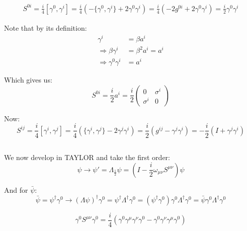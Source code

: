 \documentclass[11pt]{article}
\newcommand{\half}{\frac{1}{2}}
\begin{document}
\subsection{}

\begin{equation}
    \begin{split}
        S^{0i}=\frac{i}{4}[\gamma^0,\gamma^i] = 
        \frac{i}{4}(-\{ \gamma^0,\gamma^i\} +2\gamma^0\gamma^i)=
        \frac{i}{4}(-2g^{0i} + 2\gamma^0\gamma^i)=
        \frac{i}{2}\gamma^0\gamma^i
    \end{split}
\end{equation}

Note that by its definition:
\begin{equation}
\begin{split}
    \gamma^i&=\beta a^i\\
    \Rightarrow \beta \gamma^i &= \beta^2 a^i = a^i\\
    \Rightarrow \gamma^0\gamma^i &= a^i
\end{split}
\end{equation}

Which gives us:
\begin{equation}
    S^{0i} = \frac{i}{2}a^i =
    \frac{i}{2}
    \begin{pmatrix}
        0&\sigma^i\\
        \sigma^i & 0
    \end{pmatrix}
\end{equation}

Now: $$S^{ij} = \frac{i}{4}[\gamma^i,\gamma^j] = \frac{i}{4}(\{\gamma^i,\gamma^j\} - 2\gamma^j\gamma^i) = \frac{i}{2}(g^{ij}-\gamma^j\gamma^i) = -\frac{i}{2}(I+\gamma^j\gamma^i)$$


\subsection{}
We now develop in TAYLOR and take the first order:
\begin{equation}
    \psi\rightarrow\psi ' = \Lambda_{\half} \psi = \left(I - \frac{i}{2}\omega_{\mu\nu}S^{\mu\nu}\right)\psi
\end{equation}

\noindent
And for $\bar\psi$:
$$\bar\psi=\psi^\dagger \gamma^0 \to (\Lambda \psi)^\dagger \gamma^0 = \psi^\dagger \Lambda^\dagger \gamma^0=(\psi^\dagger \gamma^0)\gamma^0\Lambda^\dagger \gamma^0 = \bar\psi\gamma^0\Lambda^\dagger\gamma^0$$

$$\gamma^0S^{\mu \nu}\gamma^0 = \frac{i}{4}(\gamma^0 \gamma^\mu \gamma^\nu \gamma^0 - \gamma^0 \gamma^\nu \gamma^\mu \gamma^0)$$
\end{document}
